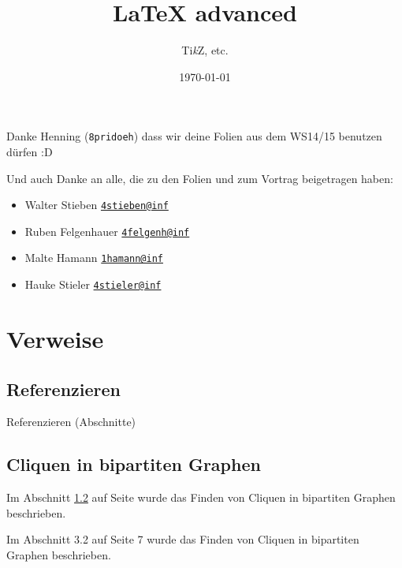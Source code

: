 \documentclass{beamer}
\title{\LaTeX{} advanced}
\subtitle{\small Ti\textit{k}Z, etc.}
\date{\footnotesize \today}
\begin{document}
	\maketitle


	\begin{frame}
		\begin{center}
			Danke Henning (\texttt{8pridoeh}) dass wir deine Folien aus dem WS14/15 benutzen dürfen :D
		\end{center}
		Und auch Danke an alle, die zu den Folien und zum Vortrag beigetragen haben:
		\begin{itemize}
			\item Walter Stieben \texttt{\href{mailto:4stieben@informatik.uni-hamburg.de}{4stieben@inf}}\\
			\item Ruben Felgenhauer \texttt{\href{mailto:4felgenh@informatik.uni-hamburg.de}{4felgenh@inf}}\\
			\item Malte Hamann \texttt{\href{mailto:1hamann@informatik.uni-hamburg.de}{1hamann@inf}}\\
			\item Hauke Stieler \texttt{\href{mailto:4stieler@informatik.uni-hamburg.de}{4stieler@inf}}
		\end{itemize}
	\end{frame}



		\section{Verweise}
		\subsection{Referenzieren}


		\begin{frame}[containsverbatim]{Referenzieren (Abschnitte)}
			\begin{latexcode}
\subsection{Cliquen in bipartiten Graphen}
\label{sec:cliques}

Im Abschnitt \ref{sec:cliques} auf Seite
\pageref{sec:cliques} wurde das Finden von
Cliquen in bipartiten Graphen beschrieben.
			\end{latexcode}

			Im Abschnitt 3.2 auf Seite 7 wurde das Finden
			von Cliquen in bipartiten Graphen beschrieben.
		\end{frame}
\end{document}
